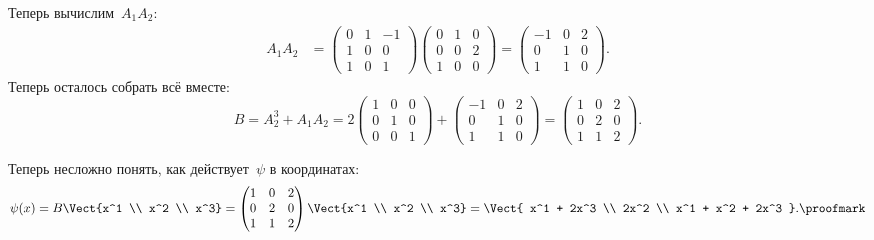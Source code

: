 \begin{proofm}
	Теперь вычислим~$A_1 A_2$:
	\begin{align*}
		A_1 A_2 &=
		\left( 
			\begin{array}{rrr}
				0 & 1 & -1
				\\
				\hline
				1 & 0 & 0
				\\
				\hline
				1 & 0 & 1
			\end{array}
		\right)
		\left( 
			\begin{array}{c|c|c}
				0 & 1 & 0
				\\
				0 & 0 & 2
				\\
				1 & 0 & 0
			\end{array}
		\right)
		=
		\left( 
			\begin{array}{rrr}
				-1 & 0 & 2
				\\
				0 & 1 & 0
				\\
				1 & 1 & 0
			\end{array}
		\right)
		.
	\end{align*}
	Теперь осталось собрать всё вместе:
	\[
		B = A_2^3 + A_1 A_2 =
		2
		\begin{pmatrix}
			1 & 0 & 0
			\\
			0 & 1 & 0
			\\
			0 & 0 & 1
		\end{pmatrix}
		+
		\begin{pmatrix}
			-1 & 0 & 2
			\\
			0 & 1 & 0
			\\
			1 & 1 & 0
		\end{pmatrix}
		=
		\begin{pmatrix}
			1 & 0 & 2
			\\
			0 & 2 & 0
			\\
			1 & 1 & 2
		\end{pmatrix}
		.
	\]

	Теперь несложно понять, как действует~$\psi$ в координатах:
	\[
		\psi(x)
		=
		B
		\Vect{x^1 \\ x^2 \\ x^3}
		=
		\begin{pmatrix}
			1 & 0 & 2
			\\
			0 & 2 & 0
			\\
			1 & 1 & 2
		\end{pmatrix}
		\Vect{x^1 \\ x^2 \\ x^3}
		=
		\Vect{
			x^1 + 2x^3
			\\
			2x^2
			\\
			x^1 + x^2 + 2x^3
		}
		.
		\proofmark
	\]
\end{proofm}

